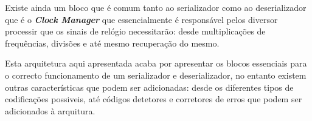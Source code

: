 Existe ainda um bloco que é comum tanto ao serializador como ao deserializador que é o \textbf{\textit{Clock Manager}} que essencialmente é responsável pelos diversor processir que os sinais de relógio necessitarão: desde multiplicações de frequências, divisões e até mesmo recuperação do mesmo.

Esta arquitetura aqui apresentada acaba por apresentar os blocos essenciais para o correcto funcionamento de um serializador e deserializador, no entanto existem outras características que podem ser adicionadas: desde os diferentes tipos de codificações possiveis, até códigos detetores e corretores de erros que podem ser adicionados à arquitura.





